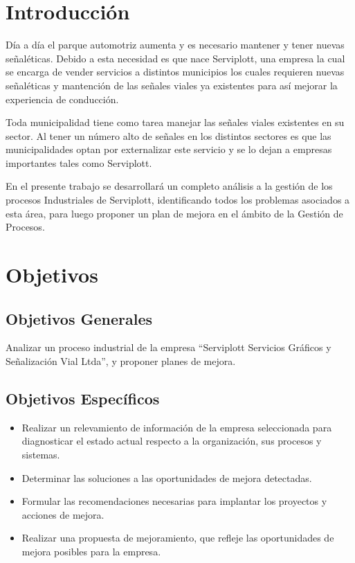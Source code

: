 %
%

\section{Introducción}
Día a día el parque automotriz aumenta y es necesario mantener y tener nuevas señaléticas. Debido a esta necesidad es que nace Serviplott, una empresa la cual se encarga de vender servicios a distintos municipios los cuales requieren nuevas señaléticas y mantención de las señales viales ya existentes para así mejorar la experiencia de conducción.
\vspace{5mm}

Toda municipalidad tiene como tarea manejar las señales viales existentes en su sector. Al tener un número alto de señales en los distintos sectores es que las municipalidades optan por externalizar este servicio y se lo dejan a empresas importantes tales como Serviplott.
\vspace{5mm}

En el presente trabajo se desarrollará un completo análisis a la gestión de los procesos Industriales de Serviplott, identificando todos los problemas asociados a esta área, para luego proponer un plan de mejora en el ámbito de la Gestión de Procesos.
\vspace{5mm}

\newpage
\section{Objetivos}
	\subsection{Objetivos Generales}
Analizar un proceso industrial de la empresa “Serviplott Servicios Gráficos y Señalización Vial Ltda”, y proponer planes de mejora.
	\subsection{Objetivos Específicos}
	\begin{itemize}

		\item Realizar un relevamiento de información de la empresa seleccionada para 					diagnosticar el estado actual respecto a la organización, sus procesos 				y sistemas.
		\item Determinar las soluciones a las oportunidades de mejora detectadas.
		\item Formular las recomendaciones necesarias para implantar los proyectos y
		acciones de mejora.
		\item Realizar una propuesta de mejoramiento, que refleje las oportunidades de 		mejora posibles para la empresa.
	\end{itemize}
	\newpage
